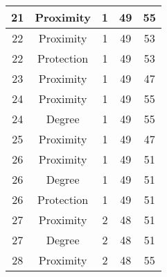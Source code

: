 \documentclass[results.tex]{subfiles}
\begin{document}
\begin{center}
\begin{tabular}{| c || c | c | c | c |}
            \hline
            21                      & Proximity                    & 1                      & 49                      & 55                   \\
            \hline
            22                      & Proximity                    & 1                      & 49                      & 53                   \\
            \hline
            22                      & Protection                   & 1                      & 49                      & 53                   \\
            \hline
            23                      & Proximity                    & 1                      & 49                      & 47                   \\
            \hline
            24                      & Proximity                    & 1                      & 49                      & 55                   \\
            \hline
            24                      & Degree                       & 1                      & 49                      & 55                   \\
            \hline
            25                      & Proximity                    & 1                      & 49                      & 47                   \\
            \hline
            26                      & Proximity                    & 1                      & 49                      & 51                   \\
            \hline
            26                      & Degree                       & 1                      & 49                      & 51                   \\
            \hline
            26                      & Protection                   & 1                      & 49                      & 51                   \\
            \hline
            27                      & Proximity                    & 2                      & 48                      & 51                   \\
            \hline
            27                      & Degree                       & 2                      & 48                      & 51                   \\
            \hline
            28                      & Proximity                    & 2                      & 48                      & 55                   \\

\end{tabular}
\end{center}
\end{document}
